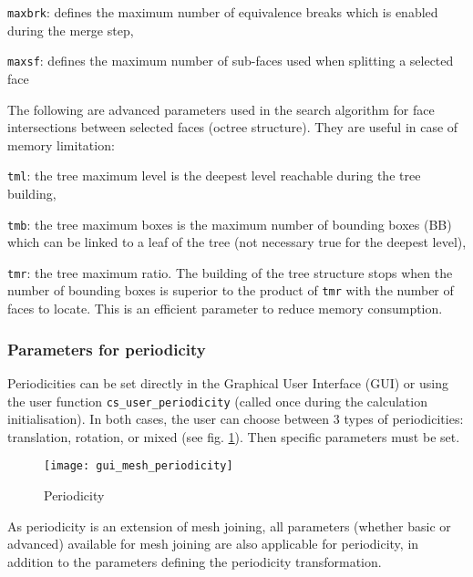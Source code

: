 {{{\begin{list}{-}{}
\item \texttt{maxbrk}: defines the maximum number of equivalence breaks which is enabled during the merge step,
\item \texttt{maxsf}: defines the maximum number of sub-faces used when splitting a selected face
\end{list}
%
The following are advanced parameters used in the search algorithm for face intersections between selected faces (octree structure). They are useful in case of memory limitation:
\begin{list}{-}{}
\item \texttt{tml}: the tree maximum level is the deepest level reachable during the tree building,
\item \texttt{tmb}: the tree maximum boxes is the maximum number of bounding boxes (BB) which can be linked to a leaf of the tree (not necessary true for the deepest level),
\item \texttt{tmr}: the tree maximum ratio. The building of the tree structure stops when the number of bounding boxes is superior to the product of \texttt{tmr} with the number of faces to locate. This is an efficient parameter to reduce memory consumption.
\end{list}

\subsubsection{Parameters for periodicity}

Periodicities can be set directly in the Graphical User Interface (GUI) or using the user function \texttt{cs\_user\_periodicity} (called once during the calculation initialisation). In both cases, the user can choose between 3 types of periodicities: translation, rotation, or mixed (see fig. \ref{fig:periodicities}).
Then specific parameters must be set.

\begin{figure}[!h]
\begin{center}
\texttt{[image: gui\_mesh\_periodicity]}
\caption{Periodicity}
\label{fig:periodicities}
\end{center}
\end{figure}

As periodicity is an extension of mesh joining, all parameters (whether basic or advanced) available for mesh joining are also applicable for periodicity, in addition to the parameters defining the periodicity transformation.

}}}
